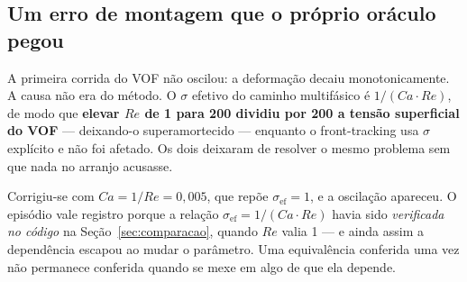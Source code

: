 \subsection{Um erro de montagem que o pr\'oprio or\'aculo pegou}

A primeira corrida do VOF n\~ao oscilou: a deforma\c{c}\~ao decaiu
monotonicamente. A causa n\~ao era do m\'etodo. O $\sigma$ efetivo do caminho
multif\'asico \'e $1/(Ca\cdot Re)$, de modo que \textbf{elevar $Re$ de 1 para 200
dividiu por 200 a tens\~ao superficial do VOF} --- deixando-o superamortecido ---
enquanto o front-tracking usa $\sigma$ expl\'icito e n\~ao foi afetado. Os dois
deixaram de resolver o mesmo problema sem que nada no arranjo acusasse.

Corrigiu-se com $Ca = 1/Re = 0{,}005$, que rep\~oe $\sigma_{\text{ef}} = 1$, e a
oscila\c{c}\~ao apareceu. O epis\'odio vale registro porque a rela\c{c}\~ao
$\sigma_{\text{ef}} = 1/(Ca\cdot Re)$ havia sido \emph{verificada no c\'odigo} na
Se\c{c}\~ao~\ref{sec:comparacao}, quando $Re$ valia 1 --- e ainda assim a
depend\^encia escapou ao mudar o par\^ametro. Uma equival\^encia conferida uma
vez n\~ao permanece conferida quando se mexe em algo de que ela depende.
